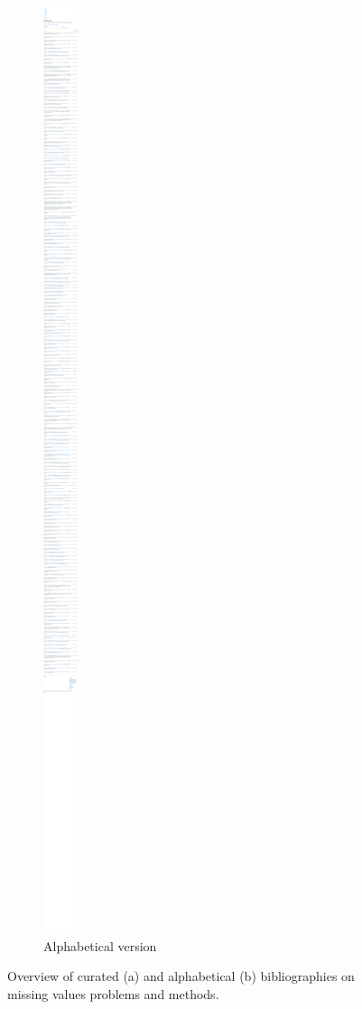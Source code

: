\begin{figure}
\begin{center}
\begin{subfigure}[b]{0.475\textwidth}
\includegraphics[width=\textwidth]{figures/local-bibliography-1.pdf}
\caption{Alphabetical version}
\end{subfigure}
\end{center}
\caption{Overview of curated (a) and alphabetical (b) bibliographies on missing values problems and methods. \label{fig:bibliography}}
\end{figure}

